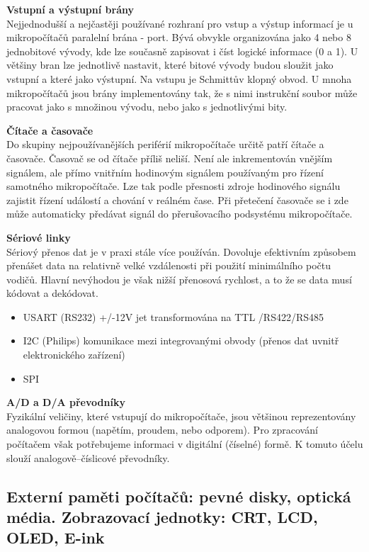 \textbf{Vstupní a výstupní brány}\\
Nejjednodušší a nejčastěji používané rozhraní pro vstup a výstup informací je u mikropočítačů paralelní brána - port. Bývá obvykle organizována jako 4 nebo 8 jednobitové vývody, kde lze současně zapisovat i číst logické informace (0 a 1). U většiny bran lze jednotlivě nastavit, které bitové vývody budou sloužit jako vstupní a které jako výstupní. Na vstupu je Schmittův klopný obvod. U mnoha mikropočítačů jsou brány implementovány tak, že s nimi instrukční soubor může pracovat jako s množinou vývodu, nebo jako s jednotlivými bity.

\textbf{Čítače a časovače}\\
Do skupiny nejpoužívanějších periférií mikropočítače určitě patří čítače a časovače. Časovač se od čítače příliš neliší. Není ale inkrementován vnějším signálem, ale přímo vnitřním hodinovým signálem používaným pro řízení samotného mikropočítače. Lze tak podle přesnosti zdroje hodinového signálu zajistit řízení událostí a chování v reálném čase. Při přetečení časovače se i zde může automaticky předávat signál do přerušovacího podsystému mikropočítače.

\textbf{Sériové linky}\\
Sériový přenos dat je v praxi stále více používán. Dovoluje efektivním způsobem přenášet data na relativně velké vzdálenosti při použití minimálního počtu vodičů. Hlavní nevýhodou je však nižší přenosová rychlost, a to že se data musí kódovat a dekódovat.
\begin{itemize}
\item USART (RS232) +/-12V jet transformována na TTL /RS422/RS485
\item I2C (Philips) komunikace mezi integrovanými obvody (přenos dat uvnitř elektronického zařízení)
\item SPI
\end{itemize}

\textbf{A/D a D/A převodníky}\\
Fyzikální veličiny, které vstupují do mikropočítače, jsou většinou reprezentovány analogovou formou (napětím, proudem, nebo odporem). Pro zpracování počítačem však potřebujeme informaci v digitální (číselné) formě. K tomuto účelu slouží analogově–číslicové převodníky.

\subsection[Externí paměti počítačů, Zobrazovací jednotky]{Externí paměti počítačů: pevné disky, optická média. Zobrazovací jednotky: CRT, LCD, OLED, E-ink}
